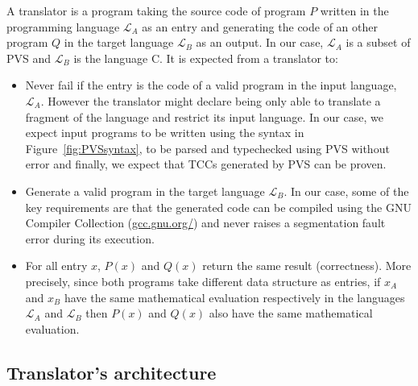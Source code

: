 \documentclass[12pt,a4paper]{article}
\begin{document}
A translator is a program taking the source code of program $P$ written in the programming language $\mathcal{L}_A$ as an entry and generating the code of an other program $Q$ in the target language $\mathcal{L}_B$ as an output. In our case, $\mathcal{L}_A$ is a subset of PVS and $\mathcal{L}_B$ is the language C. It is expected from a translator to:
\begin{itemize}
\item Never fail if the entry is the code of a valid program in the input language, $\mathcal{L}_A$. However the translator might declare being only able to translate a fragment of the language and restrict its input language. In our case, we expect input programs to be written using the syntax in Figure~\ref{fig:PVSsyntax}, to be parsed and typechecked using PVS without error and finally, we expect that TCCs generated by PVS can be proven.
\item Generate a valid program in the target language $\mathcal{L}_B$. In our case, some of the key requirements are that the generated code can be compiled using the GNU Compiler Collection (\href{https://gcc.gnu.org/}{gcc.gnu.org/}) and never raises a segmentation fault error during its execution.
\item For all entry $x$, $P(x)$ and $Q(x)$ return the same result (correctness). More precisely, since both programs take different data structure as entries, if $x_A$ and $x_B$ have the same mathematical evaluation respectively in the languages $\mathcal{L}_A$ and $\mathcal{L}_B$ then $P(x)$ and $Q(x)$ also have the same mathematical evaluation.
\end{itemize}


\subsection{Translator's architecture}
\end{document}
